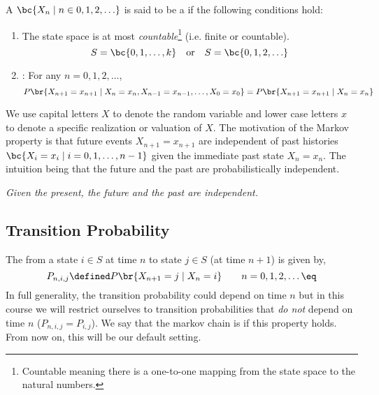\documentclass{article}
\begin{document}
A  $\bc{X_n \mid n \in 0, 1, 2, \ldots}$ is said to be a   if the following conditions hold:
\begin{enumerate}
    \item The state space is at most \textit{countable}\footnote{Countable meaning there is a one-to-one mapping from the state space to the natural numbers.} (i.e. finite or countable).
    \[ S = \bc{0, 1, \ldots, k} \quad \textrm{or} \quad S = \bc{0, 1, 2, \ldots} \]
    \item {}: For any $n = 0, 1, 2, \ldots$,
    \[ P\br{X_{n+1} = x_{n+1} \mid X_n = x_n, X_{n-1} = x_{n-1}, \ldots, X_{0} = x_{0}} = P\br{X_{n+1} = x_{n+1} \mid X_{n} = x_{n}} \]
\end{enumerate}
We use capital letters $X$ to denote the random variable and lower case letters $x$ to denote a specific realization or valuation of $X$. The motivation of the Markov property is that future events $X_{n+1} = x_{n+1}$ are independent of past histories $\bc{X_{i} = x_{i} \mid i = 0, 1, \ldots, n-1}$ given the immediate past state $X_{n} = x_{n}$. The intuition being that the future and the past are probabilistically independent.

\begin{center}
    \textit{Given the present, the future and the past are independent.}
\end{center}

\subsection{Transition Probability}

The  from a state $i \in S$ at time $n$ to state $j \in S$ (at time $n+1$) is given by,
\[ P_{n, i, j} \defined P \br{X_{n+1}= j \mid X_{n} = i} \qquad n = 0, 1, 2, \ldots \eq \label{eq:trans_prob}\]
In full generality, the transition probability could depend on time $n$ but in this course we will restrict ourselves to transition probabilities that \textit{do not} depend on time $n$ ($P_{n, i, j} = P_{i, j}$). We say that the markov chain is  if this property holds. From now on, this will be our default setting. \\
\end{document}
